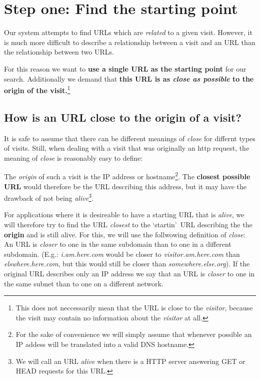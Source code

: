\documentclass[a4paper]{danarticle}
\begin{document}
  \section*{Step one: Find the starting point}
    Our system attempts to find URLs which are \textit{related} to
    a given visit. However, it is much more difficult to describe
    a relationship between a visit and an URL than the relationship
    between two URLs.
    
    For this reason we want to \textbf{use a single URL as the
    starting point} for our search. Additionally we demand that
    \textbf{this URL is as \textit{close as possible} to the
    origin of the visit.}\footnote{This does not neccessarily
    mean that the URL is close to the \textit{visitor}, because
    the visit may contain no information about the \textit{visitor}
    at all.}
    
    \subsection*{How is an URL close to the origin of a visit?}
      It is safe to assume that there can be different meanings
      of \textit{close} for differnt types of visits. Still, when
      dealing with a visit that was originally an http request,
      the meaning of \textit{close} is reasonably easy to define:
      
      The \textit{origin} of such a visit is the IP address or
      hostname\footnote{For the sake of convenience we will simply
      assume that whenever possible an IP addess will be translated
      into a valid DNS hostname.}. The \textbf{closest possible URL}
      would therefore be the URL describing this address, but it
      may have the drawback of not being \textit{alive}\footnote{We
      will call an URL \textit{alive} when there is a HTTP server
      answering GET or HEAD requests for this URL.}.
      
      For applications where it is desireable to have a starting
      URL that is \textit{alive}, we will therefore try to find the
      URL \textit{closest} to the \lq startin\rq\ URL describing
      the the \textbf{origin} and is still alive. For this, we 
      will use the follwowing definition of \textit{close}:
      An URL is \textit{closer} to one in the same subdomain 
      than to one in a different subdomain. (E.g.: \textit{i.am.here.com}
      would be closer to \textit{visitor.am.here.com} than
      \textit{elswhere.here.com}, but this would still be closer than
      \textit{somewhere.else.org}). If the original URL describes only
      an IP address we say that an URL is \textit{closer} to one
      in the same subnet than to one on a different network.
\end{document}
